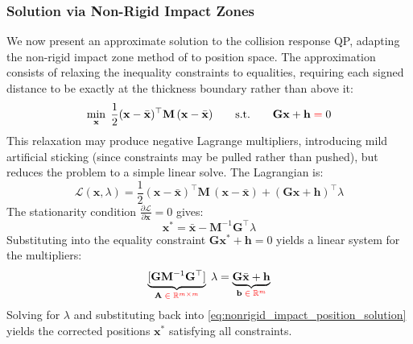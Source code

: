 \documentclass{article}
\newcommand{\pdc}[2]{\frac{\partial #1}{\partial #2}}
\newcommand{\red}[1]{\textcolor{red}{#1}}
\begin{document}
\subsubsection{Solution via Non-Rigid Impact Zones}
We now present an approximate solution to the collision response QP, adapting the non-rigid impact zone method of \cite{harmon2008robust} to position space. The approximation consists of relaxing the inequality constraints to equalities, requiring each signed distance to be exactly at the thickness boundary rather than above it:
\begin{equation}
    \min_{\mathbf{x}}\; \frac{1}{2}(\mathbf{x} - \bar{\mathbf{x}})^\top \mathbf{M}\, (\mathbf{x} - \bar{\mathbf{x}})
    \qquad 
    \text{s.t.}
    \qquad
    \mathbf{G}\mathbf{x}+\mathbf{h}\; \red{=}\; 0
\end{equation}
This relaxation may produce negative Lagrange multipliers, introducing mild artificial sticking (since constraints may be pulled rather than pushed), but reduces the problem to a simple linear solve. The Lagrangian is:
\begin{equation*}
\mathcal{L}(\mathbf{x}, \lambda) = 
    \frac{1}{2}(\mathbf{x} - \bar{\mathbf{x}})^\top \mathbf{M}\, (\mathbf{x} - \bar{\mathbf{x}}) + 
    (\mathbf{G}\mathbf{x}+\mathbf{h})^\top\lambda
\end{equation*}
The stationarity condition $\pdc{\mathcal{L}}{\mathbf{x}} = 0$ gives:
\begin{equation}
\label{eq:nonrigid_impact_position_solution}
\mathbf{x}^* = \bar{\mathbf{x}} - \mathbf{M}^{-1}\mathbf{G}^\top\lambda
\end{equation}
Substituting into the equality constraint $\mathbf{G}\mathbf{x}^* + \mathbf{h} = 0$ yields a linear system for the multipliers:
\begin{equation}
\label{eq:nonrigid_impact_linear_system}
    \underbrace{[\mathbf{G}\mathbf{M}^{-1}\mathbf{G}^\top]}_{\mathbf{A}\;\red{\in\;\mathbb{R}^{m\times m}}}\;\lambda = \underbrace{\mathbf{G}\bar{\mathbf{x}} + \mathbf{h}}_{\mathbf{b}\;\red{\in\;\mathbb{R}^{m}}}
\end{equation}
Solving for $\lambda$ and substituting back into \eqref{eq:nonrigid_impact_position_solution} yields the corrected positions $\mathbf{x}^*$ satisfying all constraints.
\end{document}
